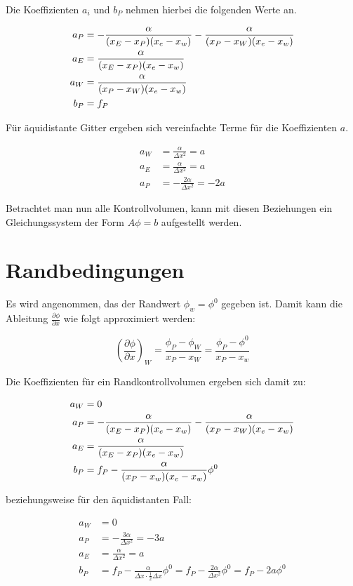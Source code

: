 \documentclass[10pt, ngerman,colorback,accentcolor=tud2d]{tudreport}
\begin{document}
Die Koeffizienten $a_i$ und $b_P$ nehmen hierbei die folgenden Werte an.

\begin{align*}
  a_P &= -\frac{\alpha}{(x_E-x_P) (x_e-x_w)} - \frac{\alpha}{(x_P-x_W) (x_e-x_w)}\\
a_E &= \frac{\alpha}{(x_E-x_P) (x_e-x_w)}\\
a_W &= \frac{\alpha}{(x_P-x_W) (x_e-x_w)}\\
b_P &= f_P
\end{align*}

Für äquidistante Gitter ergeben sich vereinfachte Terme für die Koeffizienten $a$.

\begin{align*}
  a_W &= \frac{\alpha}{\Delta x^2} = a\\
  a_E &= \frac{\alpha}{\Delta x^2} = a\\
  a_P &= - \frac{2 \alpha}{\Delta x^2} = -2a
\end{align*}

Betrachtet man nun alle Kontrollvolumen, kann mit diesen Beziehungen ein 
Gleichungssystem der Form $A\phi = b$ aufgestellt werden.

\section{Randbedingungen}
\label{sec:Randbedingungen}

Es wird angenommen, das der Randwert $\phi_w= \phi^0$ gegeben ist. Damit kann die
Ableitung $\frac{\partial \phi}{\partial x}$ wie folgt approximiert werden:

\begin{equation*}
\left(\frac{\partial \phi}{\partial x}\right)_W = \frac{\phi_P - \phi_W}{x_P - x_W} =
  \frac{\phi_P - \phi^0}{x_P - x_w}
\end{equation*}

Die Koeffizienten für ein Randkontrollvolumen ergeben sich damit zu:

\begin{align*}
  a_W &= 0\\
  a_P &= -\frac{\alpha}{(x_E-x_P) (x_e-x_w)} - \frac{\alpha}{(x_P-x_W) (x_e-x_w)}\\
  a_E &= \frac{\alpha}{(x_E-x_P) (x_e-x_w)}\\
  b_P &= f_P - \frac{\alpha}{(x_P -x_w)(x_e-x_w)}\phi^0
\end{align*}

beziehungsweise für den äquidistanten Fall:

\begin{align*}
  a_W &= 0\\
  a_P &=  -\frac{3 \alpha}{\Delta x^2} = -3a\\
  a_E &= \frac{\alpha}{\Delta x^2} = a\\
  b_P &= f_P - \frac{\alpha}{\Delta x \cdot \frac{1}{2} \Delta x}\phi^0 = f_P - 
  \frac{2\alpha}{\Delta x^2} \phi^0 = f_P - 2a \phi^0
\end{align*}
\end{document}
